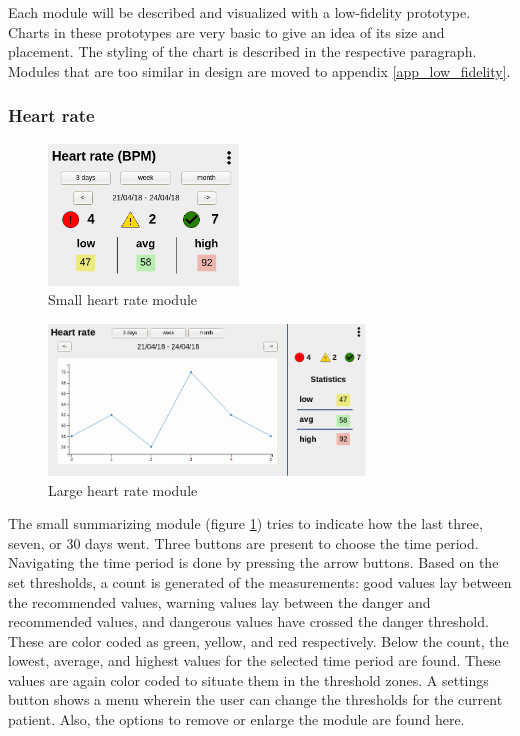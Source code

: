     Each module will be described and visualized with a low-fidelity prototype. Charts in these prototypes are very basic to give an idea of its size and placement. The styling of the chart is described in the respective paragraph. Modules that are too similar in design are moved to appendix \ref{app_low_fidelity}.

        \subsubsection{Heart rate}

        \begin{figure}[!htb]
            \centering
            \includegraphics[width=0.45\textwidth]{chapters/3_design/mockups/heart_small}
            \caption{Small heart rate module}\label{fig:hr_small}
        \end{figure}
        \begin{figure}[!htb]
            \centering
            \includegraphics[width=0.75\textwidth]{chapters/3_design/mockups/heart_large}
            \caption{Large heart rate module}\label{fig:hr_large}
        \end{figure}

        The small summarizing module (figure \ref{fig:hr_small}) tries to indicate how the last three, seven, or 30 days went. Three buttons are present to choose the time period. Navigating the time period is done by pressing the arrow buttons. Based on the set thresholds, a count is generated of the measurements: good values lay between the recommended values, warning values lay between the danger and recommended values, and dangerous values have crossed the danger threshold. These are color coded as green, yellow, and red respectively. Below the count, the lowest, average, and highest values for the selected time period are found. These values are again color coded to situate them in the threshold zones. A settings button shows a menu wherein the user can change the thresholds for the current patient. Also, the options to remove or enlarge the module are found here.

